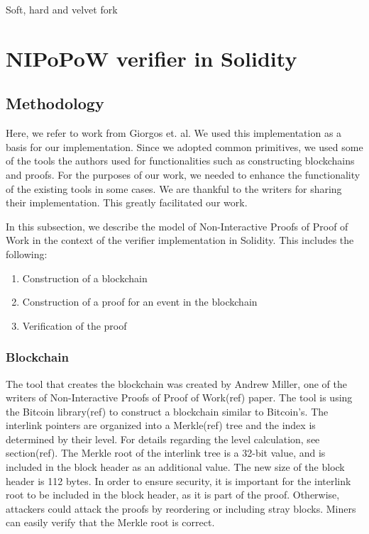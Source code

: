 Soft, hard and velvet fork

\section{NIPoPoW verifier in Solidity}

\subsection{Methodology}

Here, we refer to work from Giorgos et. al. We used this implementation as a
basis for our implementation. Since we adopted common primitives, we used some
of the tools the authors used for functionalities such as constructing
blockchains and proofs. For the purposes of our work, we needed to enhance
the functionality of the existing tools in some cases. We are thankful to the
writers for sharing their implementation. This greatly facilitated our work.

In this subsection, we describe the model of Non-Interactive Proofs of Proof of
Work in the context of the verifier implementation in Solidity. This includes
the following:

\begin{enumerate}
    \item
        Construction of a blockchain
    \item
        Construction of a proof for an event in the blockchain
    \item
        Verification of the proof
\end{enumerate}


\subsubsection{Blockchain}

The tool that creates the blockchain was created by Andrew Miller, one of the
writers of Non-Interactive Proofs of Proof of Work(ref) paper.  The tool is
using the Bitcoin library(ref) to construct a blockchain similar to Bitcoin’s.
The interlink pointers are organized into a Merkle(ref) tree and the index is
determined by their level. For details regarding the level calculation, see
section(ref). The Merkle root of the interlink tree is a 32-bit value, and is
included in the block header as an additional value. The new size of the block
header is 112 bytes. In order to ensure security, it is important for the
interlink root to be included in the block header, as it is part of the proof.
Otherwise, attackers could attack the proofs by reordering or including stray
blocks. Miners can easily verify that the Merkle root is correct.


